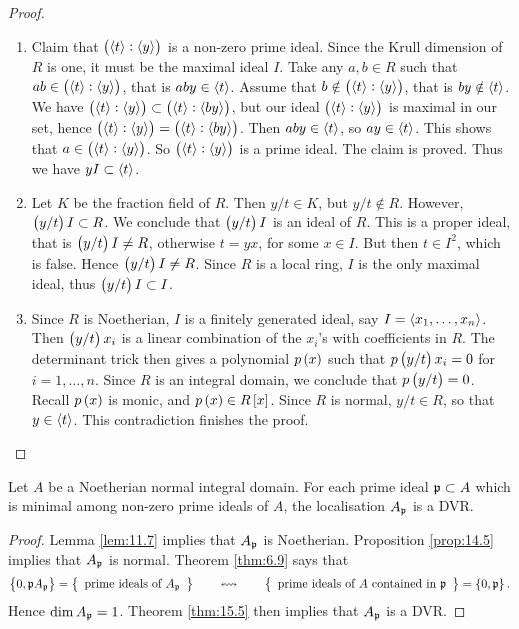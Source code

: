 \begin{proof}
\begin{itemize}[leftmargin=0.5in]
\begin{enumerate}[label=Step \arabic*.]
\item Claim that $ \br{\abr{t} : \abr{y}} $ is a non-zero prime ideal. Since the Krull dimension of $ R $ is one, it must be the maximal ideal $ I $. Take any $ a, b \in R $ such that $ ab \in \br{\abr{t} : \abr{y}} $, that is $ aby \in \left\langle t \right\rangle $. Assume that $ b \notin \br{\abr{t} : \abr{y}} $, that is $ by \notin \left\langle t \right\rangle $. We have $ \br{\abr{t} : \abr{y}} \subset \br{\abr{t} : \abr{by}} $, but our ideal $ \br{\abr{t} : \abr{y}} $ is maximal in our set, hence $ \br{\abr{t} : \abr{y}} = \br{\abr{t} : \abr{by}} $. Then $ aby \in \left\langle t \right\rangle $, so $ ay \in \left\langle t \right\rangle $. This shows that $ a \in \br{\abr{t} : \abr{y}} $. So $ \br{\abr{t} : \abr{y}} $ is a prime ideal. The claim is proved. Thus we have $ yI \subset \left\langle t \right\rangle $.


\item Let $ K $ be the fraction field of $ R $. Then $ y / t \in K $, but $ y / t \notin R $. However, $ \br{y / t}I \subset R $. We conclude that $ \br{y / t}I $ is an ideal of $ R $. This is a proper ideal, that is $ \br{y / t}I \ne R $, otherwise $ t = yx $, for some $ x \in I $. But then $ t \in I^2 $, which is false. Hence $ \br{y / t}I \ne R $. Since $ R $ is a local ring, $ I $ is the only maximal ideal, thus $ \br{y / t}I \subset I $.
\item Since $ R $ is Noetherian, $ I $ is a finitely generated ideal, say $ I = \left\langle x_1, \dots, x_n \right\rangle $. Then $ \br{y / t}x_i $ is a linear combination of the $ x_i $'s with coefficients in $ R $. The determinant trick then gives a polynomial $ p\br{x} $ such that $ p\br{y / t}x_i = 0 $ for $ i = 1, \dots, n $. Since $ R $ is an integral domain, we conclude that $ p\br{y / t} = 0 $. Recall $ p\br{x} $ is monic, and $ p\br{x} \in R\sbr{x} $. Since $ R $ is normal, $ y / t \in R $, so that $ y \in \left\langle t \right\rangle $. This contradiction finishes the proof.
\end{enumerate}
\end{itemize}
\end{proof}

\begin{corollary}
Let $ A $ be a Noetherian normal integral domain. For each prime ideal $ \mathfrak{p} \subset A $ which is minimal among non-zero prime ideals of $ A $, the localisation $ A_{\mathfrak{p}} $ is a DVR.
\end{corollary}

\begin{proof}
Lemma \ref{lem:11.7} implies that $ A_{\mathfrak{p}} $ is Noetherian. Proposition \ref{prop:14.5} implies that $ A_{\mathfrak{p}} $ is normal. Theorem \ref{thm:6.9} says that
$$ \cbr{0, \ppp A_\ppp} = \correspondence{\text{prime ideals of} \ A_\ppp}{\text{prime ideals of} \ A \ \text{contained in} \ \ppp} = \cbr{0, \ppp}. $$
Hence $ \dim A_{\mathfrak{p}} = 1 $. Theorem \ref{thm:15.5} then implies that $ A_{\mathfrak{p}} $ is a DVR.
\end{proof}

